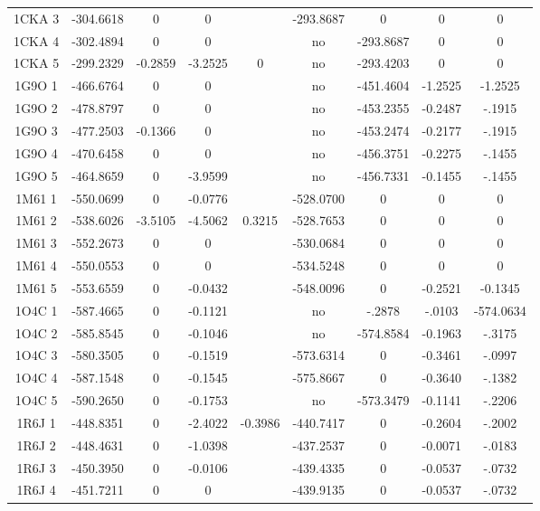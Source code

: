 \documentclass[a4paper,12pt]{article}
\begin{document}
\begin{table}[h]
\begin{tabular}{|c|c|c|c|c|c|c|c|c|}
        1CKA 3 & -304.6618 & 0 & 0 & & -293.8687 & 0 & 0 & 0 \\ 
        1CKA 4 & -302.4894 & 0 & 0 & & no & -293.8687 & 0 & 0 \\ 
        1CKA 5 & -299.2329 & -0.2859 & -3.2525 & 0 & no & -293.4203 & 0 & 0 \\ 
        1G9O 1 & -466.6764 & 0 & 0 & & no & -451.4604 & -1.2525 & -1.2525 \\       
        1G9O 2 & -478.8797 & 0 & 0 & & no & -453.2355 & -0.2487 & -.1915 \\       
        1G9O 3 & -477.2503 & -0.1366 & 0 & & no & -453.2474 & -0.2177 & -.1915 \\       
        1G9O 4 & -470.6458 & 0 & 0 & & no & -456.3751 & -0.2275 & -.1455 \\       
        1G9O 5 & -464.8659 & 0 & -3.9599 & & no & -456.7331 & -0.1455 & -.1455 \\       
        1M61 1 & -550.0699 & 0 & -0.0776 & & -528.0700 & 0 & 0 & 0 \\ 
        1M61 2 & -538.6026 & -3.5105 & -4.5062 & 0.3215 & -528.7653 & 0 & 0 & 0 \\ 
        1M61 3 & -552.2673 & 0 & 0 & & -530.0684 & 0 & 0 & 0 \\ 
        1M61 4 & -550.0553 & 0 & 0 & & -534.5248 & 0 & 0 & 0 \\ 
        1M61 5 & -553.6559 & 0 & -0.0432 & & -548.0096 & 0 & -0.2521 & -0.1345 \\          
        1O4C 1 & -587.4665 & 0 & -0.1121 & & no & -.2878 & -.0103 & -574.0634 \\        
        1O4C 2 & -585.8545 & 0 & -0.1046 & & no & -574.8584 & -0.1963 & -.3175 \\       
        1O4C 3 & -580.3505 & 0 & -0.1519 & & -573.6314 & 0 & -0.3461 & -.0997 \\        
        1O4C 4 & -587.1548 & 0 & -0.1545 & & -575.8667 & 0 & -0.3640 & -.1382 \\        
        1O4C 5 & -590.2650 & 0 & -0.1753 & & no & -573.3479 & -0.1141 & -.2206 \\       
        1R6J 1 & -448.8351 & 0 & -2.4022 & -0.3986 & -440.7417 & 0 & -0.2604 & -.2002 \\        
        1R6J 2 & -448.4631 & 0 & -1.0398 & & -437.2537 & 0 & -0.0071 & -.0183 \\        
        1R6J 3 & -450.3950 & 0 & -0.0106 & & -439.4335 & 0 & -0.0537 & -.0732 \\        
        1R6J 4 & -451.7211 & 0 & 0 & & -439.9135 & 0 & -0.0537 & -.0732 \\        

\end{tabular}
\end{table}
\end{document}
